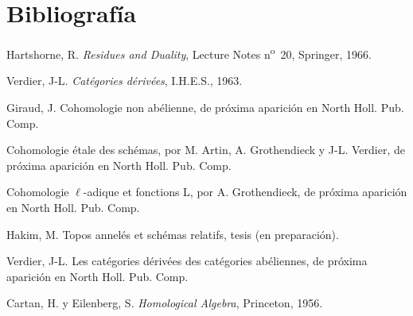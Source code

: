 \section*{Bibliografía}
\begin{description}[leftmargin=2.5cm,style=nextline]
\item[{[H]}] Hartshorne, R. \emph{Residues and Duality}, Lecture Notes n\textsuperscript{o}~20, Springer, 1966.
\item[{[V]}] Verdier, J-L. \emph{Catégories dérivées}, I.H.E.S., 1963.
\item[{[G]}] Giraud, J. Cohomologie non abélienne, de próxima aparición en North Holl. Pub. Comp.
\item[{SGA 4}] Cohomologie étale des schémas, por M. Artin, A. Grothendieck y J-L. Verdier, de próxima aparición en North Holl. Pub. Comp.
\item[{SGA 5}] Cohomologie \(\ell\)-adique et fonctions L, por A. Grothendieck, de próxima aparición en North Holl. Pub. Comp.
\item[{[1]}] Hakim, M. Topos annelés et schémas relatifs, tesis (en preparación).
\item[{[2]}] Verdier, J-L. Les catégories dérivées des catégories abéliennes, de próxima aparición en North Holl. Pub. Comp.
\item[{[MULT]}] Cartan, H. y Eilenberg, S. \emph{Homological Algebra}, Princeton, 1956.
\end{description}



\providecommand{\cS}{\mathcal S}
\providecommand{\cCz}{\mathcal C_0}
\providecommand{\cCone}{\mathcal C_1}
\providecommand{\cA}{\mathcal A}
\providecommand{\cB}{\mathcal B}
\providecommand{\cL}{\mathcal L}
\providecommand{\cI}{\mathcal I}
\providecommand{\cJ}{\mathcal J}
\providecommand{\Db}{\mathrm D}
\providecommand{\Kb}{\mathrm K}
\providecommand{\Dminus}{\mathrm D^{-}}
\providecommand{\Kminus}{\mathrm K^{-}}
\providecommand{\Kbd}{\mathrm K^{b}}
\providecommand{\Mod}{\operatorname{Mod}}
\providecommand{\Lib}{\operatorname{Lib}}
\providecommand{\Loclib}{\operatorname{Loclib}}
\providecommand{\Qcoh}{\operatorname{Qcoh}}
\providecommand{\Coh}{\operatorname{Coh}}
\providecommand{\Ext}{\operatorname{Ext}}
\providecommand{\Hom}{\operatorname{Hom}}
\providecommand{\Ob}{\operatorname{ob}}
\providecommand{\im}{\operatorname{Im}}
\providecommand{\coker}{\operatorname{Coker}}
\providecommand{\coh}{\operatorname{coh}}
\providecommand{\parf}{\operatorname{parf}}
\providecommand{\amp}{\operatorname{amp}}
\providecommand{\RHom}{\operatorname{RHom}}


